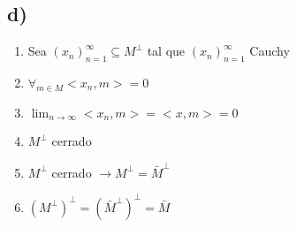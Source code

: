 \subsection*{d)}

\begin{enumerate}
	\item Sea $(x_n)_{n=1}^\infty \subseteq M^\perp$ tal que $(x_n)_{n=1}^\infty$ Cauchy
	\item $\forall_{m \in M} <x_n, m> = 0$
	\item $\lim_{n \to \infty} <x_n, m> = <x, m> = 0$
	\item $M^\perp$ cerrado
	\item $M^\perp$ cerrado $\to M^\perp = \bar{M}^\perp$
	\item $(M^\perp)^\perp = (\bar{M}^\perp)^\perp = \bar{M}$
\end{enumerate}
